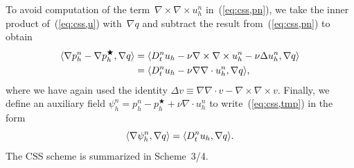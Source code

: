 To avoid computation of the term~$\nabla \times \nabla \times u_h^n$
in~(\ref{eq:css,pn}), we take the inner product of~(\ref{eq:css,u})
with~$\nabla q$ and subtract the result from~(\ref{eq:css,pn}) to
obtain
\begin{equation}\label{eq:css,tmp}
 \begin{split}
   \renni{\nabla q}{\nabla p_h^n - \nabla p_h^{\bigstar}}
   &=
   \renni{\nabla q}{D_t^n u_h
   - \nu \nabla \times \nabla \times u_h^n - \nu \Delta u_h^n} \\
   &=
   \renni{\nabla q}{D_t^n u_h - \nu \nabla \nabla \cdot u_h^n},
 \end{split}
\end{equation}
where we have again used the identity $\Delta v \equiv \nabla \nabla
\cdot v - \nabla \times \nabla \times v$. Finally, we define an
auxiliary field $\psi_h^n = p_h^n - p_h^{\bigstar} + \nu \nabla
\cdot u_h^n$ to write~(\ref{eq:css,tmp}) in the form
\begin{equation}
  \renni{\nabla q}{\nabla \psi_h^n}
  = \renni{\nabla q}{D_t^n u_h}.
\end{equation}
The CSS scheme is summarized in Scheme~3/4.

